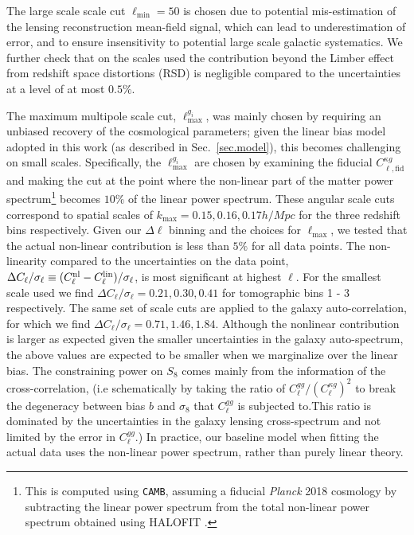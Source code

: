 \documentclass[twocolumn]{aastex631}
\begin{document}
{The large scale scale cut $\ell_\mathrm{min}=50$ is chosen due to potential mis-estimation of the lensing reconstruction mean-field signal, which can lead to underestimation of error, and to ensure insensitivity to potential large scale galactic systematics. We further check that on the scales used the contribution beyond the Limber effect from redshift space distortions (RSD) is negligible compared to the uncertainties at a level of at most $0.5\%$.

The maximum multipole scale cut, $\ell^{g_i}_\mathrm{max}$, was mainly chosen by requiring an unbiased recovery of the cosmological parameters; given the linear bias model adopted in this work (as described in Sec.~\ref{sec.model}), this becomes challenging on small scales. Specifically, the $\ell^{g_i}_\mathrm{max}$ are chosen by examining the fiducial $C^{\kappa{g}}_{\ell,\mathrm{fid}}$ and making the cut at the point where the non-linear part of the matter power spectrum\footnote{This is computed using \texttt{CAMB}, assuming a fiducial \textit{Planck} 2018 cosmology by subtracting the linear power spectrum from the total non-linear power spectrum obtained using HALOFIT \cite{Mead_2015}.} becomes $10\%$ of the linear power spectrum. These angular scale cuts correspond to spatial scales of $k_\mathrm{max}=0.15,0.16,0.17h/\si{Mpc}$  for the three redshift bins respectively. Given our {$\Delta\ell$ binning and the choices for $\ell_\mathrm{max}$, we tested that the actual non-linear contribution is less than $5\%$} for all data points. The non-linearity compared to the uncertainties on the data point, $\Delta{C}_\ell/\sigma_\ell\equiv(C^{\rm nl}_{\ell} - C^{\rm lin}_{\ell})/\sigma_\ell$, is most significant at highest $\ell$. For the smallest scale used we find $\Delta{C}_\ell/\sigma_\ell=0.21,0.30,0.41$ for tomographic bins 1 - 3 respectively. The same set of scale cuts are applied to the galaxy auto-correlation, for which we find $\Delta{C}_\ell/\sigma_\ell=0.71,1.46,1.84$. 
Although the nonlinear contribution is larger as expected given the smaller uncertainties in the galaxy auto-spectrum, the above values are expected to be smaller when we marginalize over the linear bias. The constraining power on $S_8$ comes mainly from the information of the cross-correlation, (i.e schematically by taking the ratio of $C^{gg}_\ell/(C^{\kappa{g}}_\ell)^2$ to break the degeneracy between bias $b$ and $\sigma_8$ that $C^{gg}_\ell$ is subjected to.This ratio is dominated by the uncertainties in the galaxy lensing cross-spectrum and not limited by the error in $C^{gg}_\ell$.)
{In practice, our baseline model when fitting the actual data uses the non-linear power spectrum, rather than purely linear theory.}

}
\end{document}
